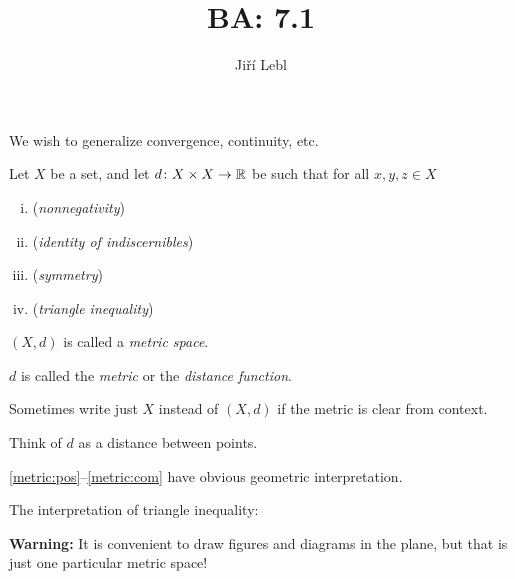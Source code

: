 \documentclass[10pt,aspectratio=169]{beamer}
\author{Ji\v{r}\'i Lebl}
\institute[OSU]{%
Departemento pri Matematiko de Oklahoma {\^S}tata Universitato}
\title{BA: 7.1}
\date{}
\begin{document}
\begin{frame}
\titlepage
\end{frame}

\begin{frame}
We wish to generalize convergence, continuity, etc.

\pause

\begin{definition}
Let $X$ be a set, and let
$d \colon X \times X \to {\mathbb{R}}$
be such that for all $x,y,z \in X$
\begin{enumerate}[(i)]
%
\item \label{metric:pos}
\pause
{}
(\emph{nonnegativity})
%
\item \label{metric:zero}
\pause
{}
(\emph{identity of indiscernibles})
%
\item \label{metric:com}
\pause
{} 
(\emph{symmetry})
%
\item \label{metric:triang}
\pause
{}
(\emph{triangle inequality})
\end{enumerate}

\pause
\medskip

$(X,d)$ is called a \emph{metric space}.

\pause
\medskip
  
$d$ is called the \emph{metric} or the \emph{distance function}.

\pause
\medskip

Sometimes write just $X$ instead of $(X,d)$
if the metric is clear from context.
\end{definition}

\pause
Think of $d$ as a distance between points.

\pause
\medskip

\eqref{metric:pos}--\eqref{metric:com} have obvious geometric
interpretation.

\end{frame}

\begin{frame}

The interpretation of triangle inequality:

\medskip

\begin{center}
\end{center}

\pause
\medskip

\textbf{Warning:}
It is convenient to draw figures and diagrams in the plane,
but that is just one particular metric space!

\end{frame}
\end{document}
